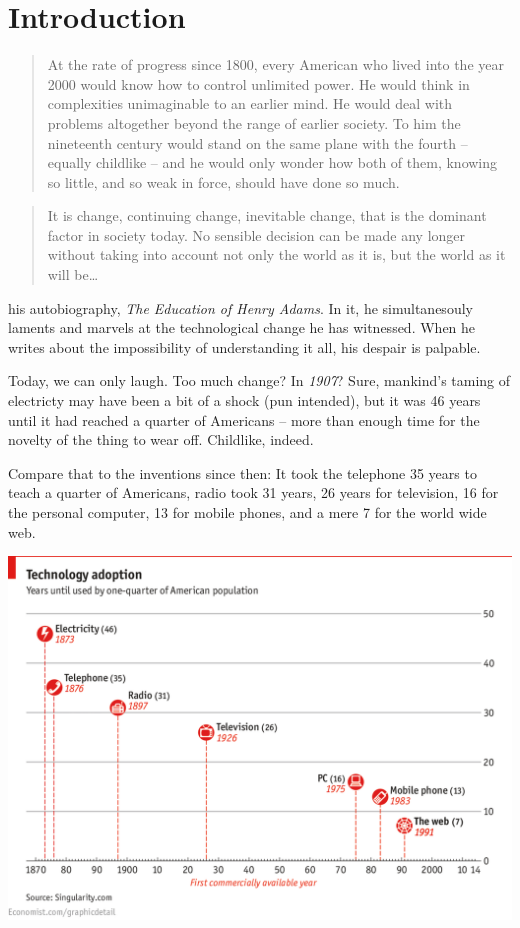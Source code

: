 \chapter{Introduction}
\begin{quote}
At the rate of progress since 1800, every American who lived into the year 2000
would know how to control unlimited power. He would think in complexities
unimaginable to an earlier mind. He would deal with problems altogether beyond
the range of earlier society. To him the nineteenth century would stand on the
same plane with the fourth -- equally childlike -- and he would only wonder how
both of them, knowing so little, and so weak in force, should have done so much.
\end{quote}

\begin{quote}
It is change, continuing change, inevitable change, that is the dominant factor
in society today. No sensible decision can be made any longer without taking
into account not only the world as it is, but the world as it will be\ldots
{}
\end{quote} 

 his autobiography, \textit{The Education of Henry
Adams}. In it, he simultanesouly laments and marvels at the technological change
he has witnessed. When he writes about the impossibility of
understanding it all, his despair is palpable. 

Today, we can only laugh. Too much change? In \textit{1907}? Sure, mankind's taming of electricty may have
been a bit of a shock (pun intended), but it was 46 years until it had reached a
quarter of Americans -- more than enough time for the novelty of the thing to
wear off. Childlike, indeed.

Compare that to the inventions since then: It took the telephone 35 years to teach a quarter of Americans, radio
took 31 years, 26 years for television, 16 for the personal computer, 13 for
mobile phones, and a mere 7 for the world wide web.\bigskip

\includegraphics[width=\textwidth]{graphics/accelerating-change}
\bigskip

